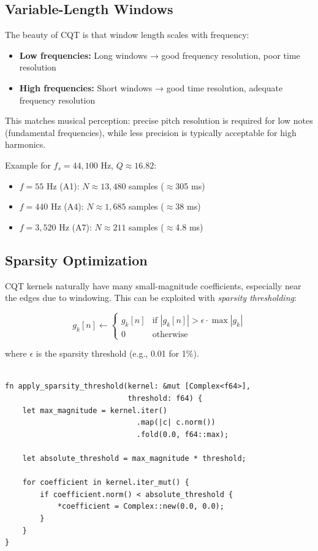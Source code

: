 \subsection{Variable-Length Windows}

The beauty of CQT is that window length scales with frequency:

\begin{itemize}
  \item \textbf{Low frequencies:} Long windows → good frequency
    resolution, poor time resolution
  \item \textbf{High frequencies:} Short windows → good time
    resolution, adequate frequency resolution
\end{itemize}

This matches musical perception: precise pitch resolution is required for low
notes (fundamental frequencies), while less precision is typically acceptable
for high harmonics.

Example for $f_s = 44{,}100$ Hz, $Q \approx 16.82$:
\begin{itemize}
  \item $f = 55$ Hz (A1): $N \approx 13{,}480$ samples ($\approx$305 ms)
  \item $f = 440$ Hz (A4): $N \approx 1{,}685$ samples ($\approx$38 ms)
  \item $f = 3{,}520$ Hz (A7): $N \approx 211$ samples ($\approx$4.8 ms)
\end{itemize}

\subsection{Sparsity Optimization}

CQT kernels naturally have many small-magnitude coefficients,
especially near the edges due to windowing. This can be exploited with
\textit{sparsity thresholding}:

\begin{equation}
  g_k[n] \leftarrow
  \begin{cases}
    g_k[n] & \text{if } |g_k[n]| > \epsilon \cdot \max|g_k| \\
    0 & \text{otherwise}
  \end{cases}
\end{equation}

where $\epsilon$ is the sparsity threshold (e.g., 0.01 for 1\%).

\begin{lstlisting}[caption={Zeroing small CQT kernel coefficients}]

fn apply_sparsity_threshold(kernel: &mut [Complex<f64>],
                            threshold: f64) {
    let max_magnitude = kernel.iter()
                              .map(|c| c.norm())
                              .fold(0.0, f64::max);

    let absolute_threshold = max_magnitude * threshold;

    for coefficient in kernel.iter_mut() {
        if coefficient.norm() < absolute_threshold {
            *coefficient = Complex::new(0.0, 0.0);
        }
    }
}
\end{lstlisting}

